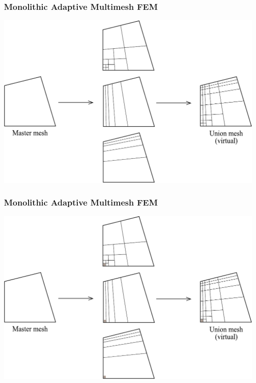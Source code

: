 \begin{frame}
  \frametitle{Monolithic Adaptive Multimesh FEM}
  \begin{center}
    \includegraphics[height=0.7\textheight]{multimesh/multimesh_new.pdf}
  \end{center}
\end{frame}

\begin{frame}
  \frametitle{Monolithic Adaptive Multimesh FEM}
  \begin{center}
    \includegraphics[height=0.7\textheight]{multimesh/mm_1.pdf}
  \end{center}
\end{frame}

